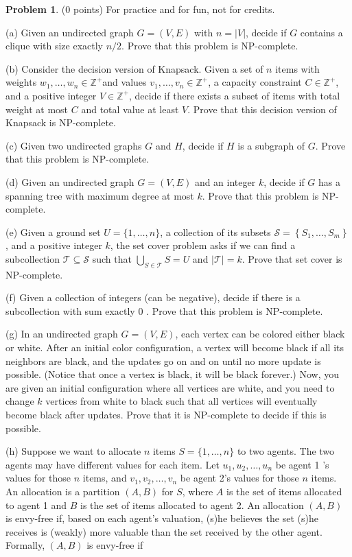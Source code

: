 \documentclass{article}
\theoremstyle{definition}
\newtheorem{prob}{Problem}
\begin{document}
	\begin{prob}

		(0 points) For practice and for fun, not for credits.
		
		(a) Given an undirected graph $G=(V, E)$ with $n=|V|$, decide if $G$ contains a clique with size exactly $n / 2$. Prove that this problem is NP-complete.
		
		(b) Consider the decision version of Knapsack. Given a set of $n$ items with weights $w_{1}, \ldots, w_{n} \in \mathbb{Z}^{+}$and values $v_{1}, \ldots, v_{n} \in \mathbb{Z}^{+}$, a capacity constraint $C \in \mathbb{Z}^{+}$, and a positive integer $V \in \mathbb{Z}^{+}$, decide if there exists a subset of items with total weight at most $C$ and total value at least $V$. Prove that this decision version of Knapsack is NP-complete.
		
		(c) Given two undirected graphs $G$ and $H$, decide if $H$ is a subgraph of $G$. Prove that this problem is NP-complete.
		
		(d) Given an undirected graph $G=(V, E)$ and an integer $k$, decide if $G$ has a spanning tree with maximum degree at most $k$. Prove that this problem is NP-complete.
		
		(e) Given a ground set $U=\{1, \ldots, n\}$, a collection of its subsets $\mathcal{S}=\left\{S_{1}, \ldots, S_{m}\right\}$, and a positive integer $k$, the set cover problem asks if we can find a subcollection $\mathcal{T} \subseteq \mathcal{S}$ such that $\bigcup_{S \in \mathcal{T}} S=U$ and $|\mathcal{T}|=k$. Prove that set cover is NP-complete.
		
		(f) Given a collection of integers (can be negative), decide if there is a subcollection with sum exactly 0 . Prove that this problem is NP-complete.
		
		(g) In an undirected graph $G=(V, E)$, each vertex can be colored either black or white. After an initial color configuration, a vertex will become black if all its neighbors are black, and the updates go on and on until no more update is possible. (Notice that once a vertex is black, it will be black forever.) Now, you are given an initial configuration where all vertices are white, and you need to change $k$ vertices from white to black such that all vertices will eventually become black after updates. Prove that it is NP-complete to decide if this is possible.
		
		(h) Suppose we want to allocate $n$ items $S=\{1, \ldots, n\}$ to two agents. The two agents may have different values for each item. Let $u_{1}, u_{2}, \ldots, u_{n}$ be agent 1 's values for those $n$ items, and $v_{1}, v_{2}, \ldots, v_{n}$ be agent 2's values for those $n$ items. An allocation is a partition $(A, B)$ for $S$, where $A$ is the set of items allocated to agent 1 and $B$ is the set of items allocated to agent 2. An allocation $(A, B)$ is envy-free if, based on each agent's valuation, (s)he believes the set (s)he receives is (weakly) more valuable than the set received by the other agent. Formally, $(A, B)$ is envy-free if
		

\end{prob}
\end{document}
